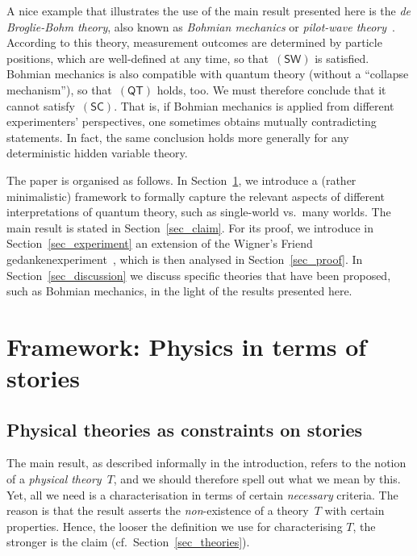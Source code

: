 \documentclass[12pt]{article}
\theoremstyle{plain}
\theoremstyle{definition}
\newcommand*{\QT}{\mathsf{(QT)}}
\newcommand*{\SW}{\mathsf{(SW)}}
\newcommand*{\SelfCons}{\mathsf{(SC)}}
\begin{document}
A nice example that illustrates the use of the main result presented here is the \emph{de Broglie-Bohm theory}, also known as \emph{Bohmian mechanics} or \emph{pilot-wave theory}~\cite{deBroglie27,Bohm52,DuTe09}. According to this theory, measurement outcomes are determined by particle positions, which are well-defined at any time, so that~$\SW$ is satisfied. Bohmian mechanics is also compatible with quantum theory (without a ``collapse mechanism''), so that~$\QT$ holds, too. We must therefore conclude that it cannot satisfy~$\SelfCons$. That is, if Bohmian mechanics is applied from different experimenters' perspectives, one sometimes obtains mutually contradicting statements. In fact, the same conclusion holds more generally for any deterministic hidden variable theory. 

The paper is organised as follows.  In Section~\ref{sec_framework}, we introduce a (rather minimalistic) framework to formally capture the relevant aspects of different interpretations of quantum theory, such as single-world vs.\ many worlds. The main result is stated  in Section~\ref{sec_claim}. For its proof, we introduce in Section~\ref{sec_experiment} an extension of the Wigner's Friend gedankenexperiment~\cite{Wigner67}, which is then analysed in Section~\ref{sec_proof}. In Section~\ref{sec_discussion} we discuss specific theories that have been proposed, such as Bohmian mechanics, in the light of the results presented here. 


\section{Framework: Physics in terms of stories} \label{sec_framework}

\subsection{Physical theories as constraints on stories} \label{sec_phystheory}

The main result, as described informally in the introduction, refers to the notion of a \emph{physical theory}~$T$, and we should therefore spell out what we mean by this. Yet, all we need is a characterisation in terms of certain \emph{necessary} criteria. The reason is that the result asserts the \emph{non}-existence of a theory~$T$ with certain properties. Hence, the looser the definition we use for characterising $T$, the stronger is the claim (cf.\ Section~\ref{sec_theories}).
\end{document}
